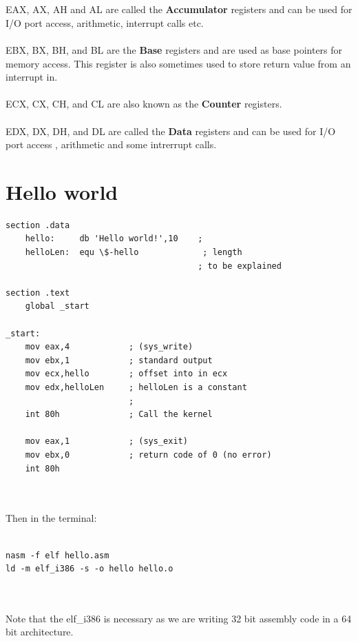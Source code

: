 \documentclass[10pt,a4paper]{book}
\begin{document}
\\\\
EAX, AX, AH and AL are called the \textbf{Accumulator} registers and can be used for I/O port access, arithmetic, interrupt calls etc.\\\\
EBX, BX, BH, and BL are the \textbf{Base} registers and are used as base pointers for memory access. This register is also sometimes used to store return value from an interrupt in. \\\\
ECX, CX, CH, and CL are also known as the \textbf{Counter} registers. \\\\
EDX, DX, DH, and DL are called the \textbf{Data} registers and can be used for I/O port access , arithmetic and some intrerrupt calls.

\newpage
\section{Hello world}
\begin{verbatim}
section .data
	hello:     db 'Hello world!',10    ; 
	helloLen:  equ \$-hello             ; length 
	                                   ; to be explained

section .text
	global _start

_start:
	mov eax,4            ; (sys_write)
	mov ebx,1            ; standard output
	mov ecx,hello        ; offset into in ecx
	mov edx,helloLen     ; helloLen is a constant
	                     ;  
	int 80h              ; Call the kernel

	mov eax,1            ; (sys_exit)
	mov ebx,0            ; return code of 0 (no error)
	int 80h
\end{verbatim}
\\\\
Then in the terminal:\\\\
\begin{verbatim}
nasm -f elf hello.asm
ld -m elf_i386 -s -o hello hello.o
\end{verbatim}
\\\\
Note that the elf\_i386 is necessary as we are writing 32 bit assembly code in a 64 bit architecture.
\newpage
\end{document}
